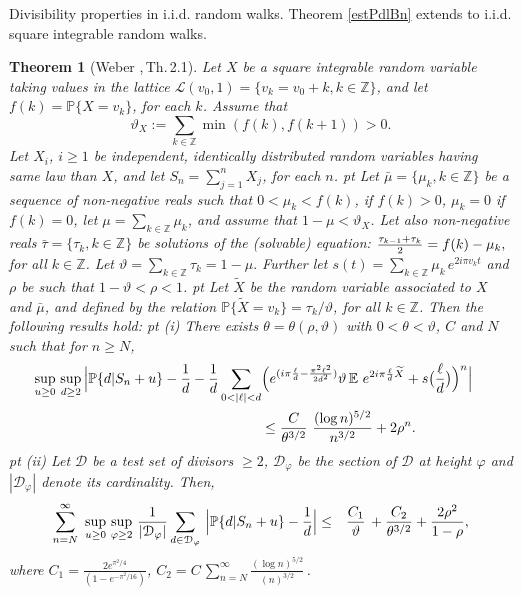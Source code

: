 \documentclass[11pt,draft,reqno]{amsart}
\makeatletter
\def\section{\@startsection{section}{1}%
     \z@{.7\linespacing\@plus\linespacing}{.5\linespacing}%
     {\bfseries%
     \centering
     }}
\newtheorem{theorem}{Theorem}[section]
\theoremstyle{definition}
\theoremstyle{remarks}
\numberwithin{equation}{section}
\def \O{{\Omega}}
\def \p{{\varphi}}
\def \t{{\vartheta}}
\def \m{{\mu}}
\def\A{{\mathcal A}}
\def\P{{\mathcal P}}
\def\E{{\mathbb E \,}}
\def\P{{\mathbb P}}
\def\Z{{\mathbb Z}}
\def\N{{\mathbb N}}
\def\beq{\begin{equation}}
\def\eeq{\end{equation}}
\makeatother
\begin{document}
\section{Divisibility properties in  i.i.d.   random walks.} \label{s4}
    Theorem \ref{estPdlBn} extends to     
i.i.d.  square integrable random walks.  \begin{theorem}[Weber \cite{W9},\,Th.\,2.1]\label{uniform.semi.local.limit.theorem} Let $X  $  be  a square integrable  random variable
      taking values in the  lattice $\mathcal L(v_0,1)=\big\{v_k=v_0+ k,k\in \Z\big\}$, and let $f(k)=\P\{X=v_k\}$, for each $k$.   
Assume that 
   \beq \label{bp}\t_X   :=\sum_{k\in \Z}\min(f(k), f(k+1))>0.
   \eeq  
   Let $  X_i$, $i\ge 1 $  be  independent, identically distributed random variables having same law than $X$, and let $S_n=\sum_{j=1}^nX_j$, for each $n$.  
 pt   Let $ \bar \m= \{ \m_k, k\in \Z\}$ be a   sequence of non-negative reals such that  $0<\m_k < f(k) $, if $f(k)>0$,   $\m_k=0$ if $f(k)=0$,    let  $ \m= \sum_{k\in \Z}\m_k$, and assume that $1- \m< \t_X$.   
   Let also non-negative reals $\bar \tau=  \{ \tau_k, k\in \Z\}$ be  solutions of the (solvable) equation:   
 $ {\tau_{k-1}+\tau_k\over 2} =f(k)  - \m_k,
 $ for all $k \in \Z$.  
Let   $\t = \sum_{k\in \Z}  \tau_k = 1- \m.$ Further let $s(t) =\sum_{k\in \Z} \m_k\, e^{ 2i \pi   v_kt}$ and    $\rho$ be such  that  $1-\t<\rho<1$.   
   pt      Let $\widetilde X$ be the   random variable associated  to $X$  and $\bar \m$, and defined by the relation
 $ \P\{ \widetilde X =v_k\}= {\tau_k}/{\t}$, for all  $k\in \Z   $.
 Then the following results hold:
 pt {\rm (i)}
There exists  
$\theta=\theta(\rho,\t)$ with  $ 0< \theta <\t$,  
$C$  and $N$ 
 such that for $  n \ge N$,
\begin{align*}   \sup_{u\ge 0}\,\sup_{d\ge 2} \Big| \P \{ d|S_n+u  \}   -  {1\over d}-  {1\over d}\sum_{ 0< |\ell|<d }& \Big( e^{ (i\pi {\ell\over   d }-{ \pi^2\ell^2\over 2 d^2}) } \t\,
 \E \,e^{2i \pi {\ell\over   d }\widetilde X  }   +s\big(  {\ell\over   d }\big)\Big)^n \Big|
  \cr  &\le    \frac{C }{ \theta ^{3/2}}\   \frac{(\log  n)^{5/2}}{ n^{3/2}}+2\rho^n.
\end{align*}
  pt   {\rm (ii)} Let   $\mathcal D$ be a test set of divisors $\ge 2$,   $\mathcal D_\p$ be the section of $\mathcal D$ at height $\p$  and $|\mathcal D_\p|$ denote its   cardinality. Then,
    \begin{eqnarray*}
      \sum_{n=N}^\infty \   \sup_{u\ge 0} \, \sup_{\p\ge 2}\, {1\over |\mathcal D_\p |} \sum_{d\in \mathcal D_\p } \,\Big| \P \{d|S_n+u  \}   - {1\over d}\Big|
    & \le  &    \frac{C_1}{\t}
 \,  
         +  \frac{C_2 }{ \theta ^{3/2}} +\frac{2\rho^2}{1-\rho},
\end{eqnarray*}
where $C_1=\frac{2e^{     { \pi^2/ 4 }  }}
     {(1-e^{   -    {  \pi^2/ 16} }   ) }$, $C_2= C\,  \sum_{n=N}^\infty  \frac{(\log {n})^{5/2} }{ ({n})^{3/2}}$\,.
     \end{theorem} 
\end{document}
